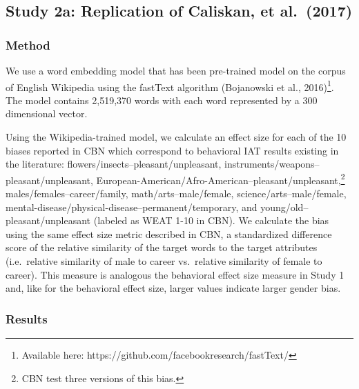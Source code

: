 \documentclass[10pt, letterpaper]{article}
\begin{document}
\subsection{Study 2a: Replication of Caliskan, et
al.~(2017)}\label{study-2a-replication-of-caliskan-et-al.2017}

\subsubsection{Method}\label{method-1}

We use a word embedding model that has been pre-trained model on the
corpus of English Wikipedia using the fastText algorithm (Bojanowski et
al.,
2016)\footnote{Available here: https://github.com/facebookresearch/fastText/}.
The model contains 2,519,370 words with each word represented by a 300
dimensional vector.

Using the Wikipedia-trained model, we calculate an effect size for each
of the 10 biases reported in CBN which correspond to behavioral IAT
results existing in the literature:
flowers/insects--pleasant/unpleasant,
instruments/weapons--pleasant/unpleasant,
European-American/Afro-American--pleasant/unpleasant,\footnote{CBN test three versions of this bias.}
males/females--career/family, math/arts--male/female,
science/arts--male/female,
mental-disease/physical-disease--permanent/temporary, and
young/old--pleasant/unpleasant (labeled as WEAT 1-10 in CBN). We
calculate the bias using the same effect size metric described in CBN, a
standardized difference score of the relative similarity of the target
words to the target attributes (i.e.~relative similarity of male to
career vs.~relative similarity of female to career). This measure is
analogous the behavioral effect size measure in Study 1 and, like for
the behavioral effect size, larger values indicate larger gender bias.

\subsubsection{Results}\label{results-1}
\end{document}
